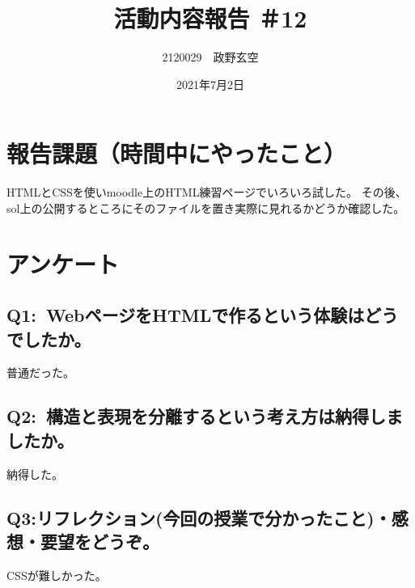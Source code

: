 \documentclass[12pt,a4j]{jarticle}
\begin{document}
\title{活動内容報告 ＃12}
\author{2120029　政野玄空}
\date{2021年7月2日}
\maketitle

\section{報告課題（時間中にやったこと）}
HTMLとCSSを使いmoodle上のHTML練習ページでいろいろ試した。
その後、sol上の公開するところにそのファイルを置き実際に見れるかどうか確認した。


\section{アンケート}

\subsection{Q1:~WebページをHTMLで作るという体験はどうでしたか。}
普通だった。
\subsection{Q2:~構造と表現を分離するという考え方は納得しましたか。}
納得した。
\subsection{Q3:リフレクション(今回の授業で分かったこと)・感想・要望をどうぞ。}
CSSが難しかった。
\end{document}
